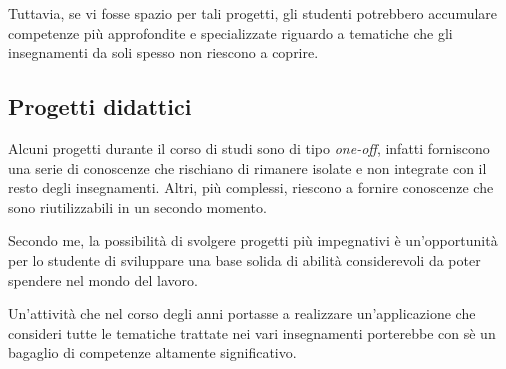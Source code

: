 Tuttavia, se vi fosse spazio per tali progetti, gli studenti potrebbero
accumulare competenze più approfondite e specializzate riguardo a tematiche che
gli insegnamenti da soli spesso non riescono a coprire.

\subsection{Progetti didattici}

Alcuni progetti durante il corso di studi sono di tipo \emph{one-off}, infatti
forniscono una serie di conoscenze che rischiano di rimanere isolate e non
integrate con il resto degli insegnamenti. Altri, più complessi, riescono a
fornire conoscenze che sono riutilizzabili in un secondo momento.

Secondo me, la possibilità di svolgere progetti più impegnativi è
un'opportunità per lo studente di sviluppare una base solida di abilità
considerevoli da poter spendere nel mondo del lavoro.

Un'attività che nel corso degli anni portasse a realizzare un'applicazione che
consideri tutte le tematiche trattate nei vari insegnamenti porterebbe con sè
un bagaglio di competenze altamente significativo.
